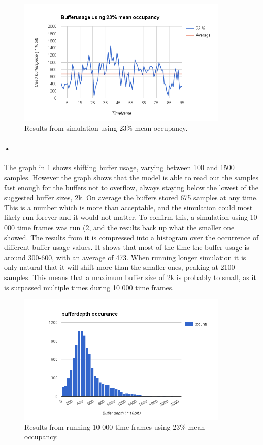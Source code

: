 \documentclass[a4paper, 12pt]{report}\dfrac{\right }{•}
\begin{document}
\begin{figure}[h!]
	\centering
		\includegraphics[width=0.9\textwidth]{images/23-occ.png}
		\caption{Results from simulation using 23\% mean occupancy.}
		\label{fig:23-occ}
\end{figure}

\paragraph{•}
The graph in \ref{fig:23-occ} shows shifting buffer usage, varying between 100 and 1500 samples.
However the graph shows that the model is able to read out the samples fast enough for the buffers not to overflow, always staying below the lowest of the suggested buffer sizes, 2k.
On average the buffers stored 675 samples at any time.
This is a number which is more than acceptable, and the simulation could most likely run forever and it would not matter.
To confirm this, a simulation using 10 000 time frames was run (\ref{fig:10k-23-occ}, and the results back up what the smaller one showed.
The results from it is compressed into a histogram over the occurrence of different buffer usage values.
It shows that most of the time the buffer usage is around 300-600, with an average of 473.
When running longer simulation it is only natural that it will shift more than the smaller ones, peaking at 2100 samples.
This means that a maximum buffer size of 2k is probably to small, as it is surpassed multiple times during 10 000 time frames.

\begin{figure}[h!]
	\centering
		\includegraphics[width=0.9\textwidth]{images/10k-23-occ.png}
		\caption{Results from running 10 000 time frames using 23\% mean occupancy.}
		\label{fig:10k-23-occ}
\end{figure}
\end{document}
